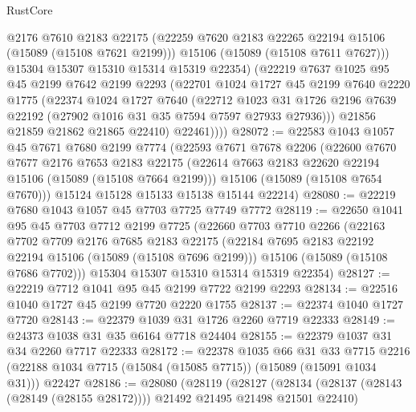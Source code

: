 \begin{lexlean}{RustCore}
\begin{coremodule}
              @2176
              @7610
              @2183
              @22175
              (@22259 @7620 @2183 @22265 @22194 @15106 (@15089 (@15108 @7621 @2199)))
              @15106
              (@15089 (@15108 @7611 @7627)))
            @15304
            @15307
            @15310
            @15314
            @15319
            @22354)
          (@22219
            @7637
            @1025
            @95
            @45
            @2199
            @7642
            @2199
            @2293
            (@22701
              @1024
              @1727
              @45
              @2199
              @7640
              @2220
              @1775
              (@22374
                @1024
                @1727
                @7640
                (@22712
                  @1023
                  @31
                  @1726
                  @2196
                  @7639
                  @22192
                  (@27902 @1016 @31 @35 @7594 @7597 @27933 @27936)))
              @21856
              @21859
              @21862
              @21865
              @22410)
            @22461))))
@28072 := @22583
    @1043
    @1057
    @45
    @7671
    @7680
    @2199
    @7774
    (@22593
      @7671
      @7678
      @2206
      (@22600
        @7670
        @7677
        @2176
        @7653
        @2183
        @22175
        (@22614 @7663 @2183 @22620 @22194 @15106 (@15089 (@15108 @7664 @2199)))
        @15106
        (@15089 (@15108 @7654 @7670)))
      @15124
      @15128
      @15133
      @15138
      @15144
      @22214)
@28080 := @22219 @7680 @1043 @1057 @45 @7703 @7725 @7749 @7772
@28119 := @22650
    @1041
    @95
    @45
    @7703
    @7712
    @2199
    @7725
    (@22660
      @7703
      @7710
      @2266
      (@22163
        @7702
        @7709
        @2176
        @7685
        @2183
        @22175
        (@22184 @7695 @2183 @22192 @22194 @15106 (@15089 (@15108 @7696 @2199)))
        @15106
        (@15089 (@15108 @7686 @7702)))
      @15304
      @15307
      @15310
      @15314
      @15319
      @22354)
@28127 := @22219 @7712 @1041 @95 @45 @2199 @7722 @2199 @2293
@28134 := @22516 @1040 @1727 @45 @2199 @7720 @2220 @1755
@28137 := @22374 @1040 @1727 @7720
@28143 := @22379 @1039 @31 @1726 @2260 @7719 @22333
@28149 := @24373 @1038 @31 @35 @6164 @7718 @24404
@28155 := @22379 @1037 @31 @34 @2260 @7717 @22333
@28172 := @22378
    @1035
    @66
    @31
    @33
    @7715
    @2216
    (@22188 @1034 @7715 (@15084 (@15085 @7715)) (@15089 (@15091 @1034 @31)))
    @22427
@28186 := @28080
    (@28119
      (@28127
        (@28134 (@28137 (@28143 (@28149 (@28155 @28172)))) @21492 @21495 @21498 @21501 @22410)

\end{coremodule}
\end{lexlean}
